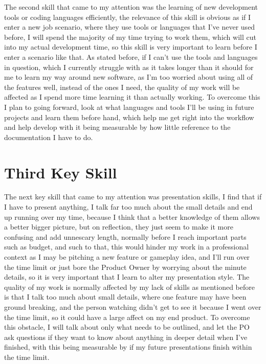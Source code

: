 \documentclass{scrartcl}
\begin{document}
The second skill that came to my attention was the learning of new development tools or coding languages efficiently, the relevance of this skill is obvious as if I enter a new job scenario, where they use tools or languages that I've never used before, I will spend the majority of my time trying to work them, which will cut into my actual development time, so this skill is very important to learn before I enter a scenario like that.  As stated before, if I can't use the tools and languages in question, which I currently struggle with as it takes longer than it should for me to learn my way around new software, as I'm too worried about using all of the features well, instead of the ones I need, the quality of my work will be affected as I spend more time learning it than actually working. To overcome this I plan to going forward, look at what languages and tools I'll be using in future projects and learn them before hand, which help me get right into the workflow and help develop with it being measurable by how little reference to the documentation I have to do. 


\section{Third Key Skill}

The next key skill that came to my attention was presentation skills, I find that if I have to present anything, I talk far too much about the small details and end up running over my time, because I think that a better knowledge of them allows a better bigger picture, but on reflection, they just seem to make it more confusing and add unnescary length, normally before I reach important parts such as budget, and such to that, this would hinder my work in a professional context as I may be pitching a new feature or gameplay idea, and I'll run over the time limit or just bore the Product Owner by worrying about the minute details, so it is very important that I learn to alter my presentation style. The quality of my work is normally affected by my lack of skills as mentioned before is that I talk too much about small details, where one feature may have been ground breaking, and the person watching didn't get to see it because I went over the time limit, so it could have a large affect on my end product. To overcome this obstacle, I will talk about only what needs to be outlined, and let the PO ask questions if they want to know about anything in deeper detail when I've finished, with this being measurable by if my future presentations finish within the time limit. 
\end{document}
